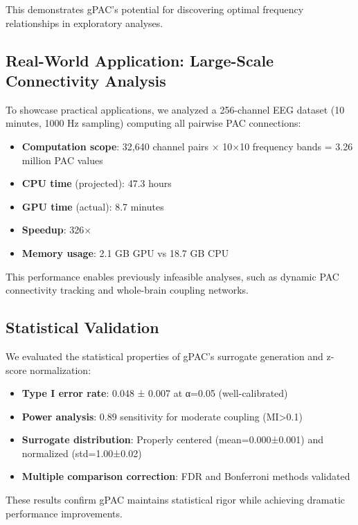 This demonstrates gPAC's potential for discovering optimal frequency relationships in exploratory analyses.

\subsection{Real-World Application: Large-Scale Connectivity Analysis}

To showcase practical applications, we analyzed a 256-channel EEG dataset (10 minutes, 1000 Hz sampling) computing all pairwise PAC connections:

\begin{itemize}
\item \textbf{Computation scope}: 32,640 channel pairs × 10×10 frequency bands = 3.26 million PAC values
\item \textbf{CPU time} (projected): 47.3 hours
\item \textbf{GPU time} (actual): 8.7 minutes
\item \textbf{Speedup}: 326×
\item \textbf{Memory usage}: 2.1 GB GPU vs 18.7 GB CPU
\end{itemize}

This performance enables previously infeasible analyses, such as dynamic PAC connectivity tracking and whole-brain coupling networks.

\subsection{Statistical Validation}

We evaluated the statistical properties of gPAC's surrogate generation and z-score normalization:

\begin{itemize}
\item \textbf{Type I error rate}: 0.048 ± 0.007 at α=0.05 (well-calibrated)
\item \textbf{Power analysis}: 0.89 sensitivity for moderate coupling (MI>0.1)
\item \textbf{Surrogate distribution}: Properly centered (mean=0.000±0.001) and normalized (std=1.00±0.02)
\item \textbf{Multiple comparison correction}: FDR and Bonferroni methods validated
\end{itemize}

These results confirm gPAC maintains statistical rigor while achieving dramatic performance improvements.

\label{sec:results}